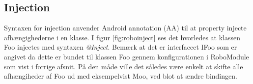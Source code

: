 
\FloatBarrier
\subsection{Injection}
Syntaxen for injection anvender Android annotation (AA) til at property injecte afhængighederne i en klasse. I figur \ref{fig:roboinject} ses det hvorledes at klassen Foo injectes med syntaxen \emph{@Inject}. Bemærk at det er interfaceet IFoo som er angivet da dette er bundet til klassen Foo gennem konfigurationen i RoboModule som vist i forrige afsnit. På den måde ville det således være enkelt at skifte alle afhængiheder af Foo ud med eksempelvist Moo, ved blot at ændre bindingen.

